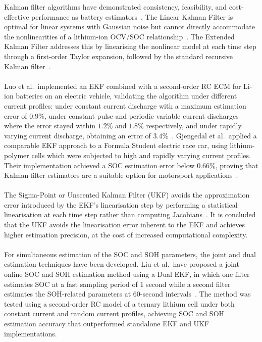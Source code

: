 Kalman filter algorithms have demonstrated consistency, feasibility, and cost-effective performance as battery estimators~\cite{EKFEV}.
The Linear Kalman Filter is optimal for linear systems with Gaussian noise but cannot directly accommodate the nonlinearities of 
a lithium-ion \acs{OCV}/\acs{SOC} relationship~\cite{SOCSOH}. The Extended Kalman Filter addresses this by linearising the nonlinear model at each
time step through a first-order Taylor expansion, followed by the standard recursive Kalman filter~\cite{plett2015battery}.
\\
\\
Luo et al.~implemented an \acs{EKF} combined with a second-order RC \acs{ECM} for \acs{Li-ion} batteries on an electric vehicle, validating the algorithm
under different current profiles: under constant current discharge with a maximum estimation error of $0.9\%$, under constant pulse and 
periodic variable current discharges where the error stayed within $1.2\%$ and $1.8\%$ respectively, and under rapidly varying current
discharge, obtaining an error of $3.4\%$~\cite{EKFEV}. Gjengedal et al.~applied a comparable \acs{EKF} approach to a Formula Student 
electric race car, using lithium-polymer cells which were subjected to high and rapidly varying current profiles. 
Their implementation achieved a \acs{SOC} estimation error below $0.66\%$, proving that Kalman filter estimators
are a suitable option for motorsport applications~\cite{BatteryKalmanRaceCar}.
\\
\\
The Sigma-Point or Unscented Kalman Filter (\acs{UKF}) avoids the approximation error introduced by the \acs{EKF}'s linearisation 
step by performing a statistical linearisation at each time step rather than computing Jacobians~\cite{plett2015battery}. 
It is concluded that the \acs{UKF} avoids the linearisation error inherent to the \acs{EKF} and achieves higher estimation precision, at 
the cost of increased computational complexity.
\\
\\
For simultaneous estimation of the \acs{SOC} and \acs{SOH} parameters, the joint and dual estimation techniques have been developed.
Liu et al.~have proposed a joint online \acs{SOC} and \acs{SOH} estimation method using a Dual \acs{EKF}, in which one filter estimates \acs{SOC} at a fast 
sampling period of 1 second while a second filter estimates the \acs{SOH}-related parameters at 60-second intervals~\cite{SOCSOH}. 
The method was tested using a second-order RC model of a ternary lithium cell under both constant current and random current 
profiles, achieving \acs{SOC} and \acs{SOH} estimation accuracy that outperformed standalone \acs{EKF} and \acs{UKF} implementations.


